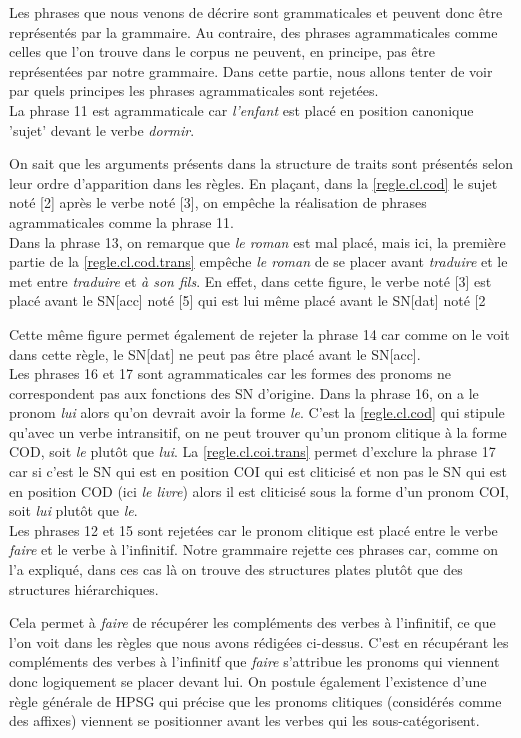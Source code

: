 Les phrases que nous venons de décrire sont grammaticales et peuvent donc être représentés par la grammaire.
Au contraire, des phrases agrammaticales comme celles que l'on trouve dans le corpus ne peuvent, en principe, pas être représentées par notre grammaire.
Dans cette partie, nous allons tenter de voir par quels principes les phrases agrammaticales sont rejetées.\\

La phrase 11 est agrammaticale car \emph{l'enfant} est placé en position canonique 'sujet' devant le verbe \emph{dormir}.

On sait que les arguments présents dans la structure de traits sont présentés selon leur ordre d'apparition dans les règles.
En plaçant, dans la \autoref{regle.cl.cod} le sujet noté [2] après le verbe noté [3], on empêche la réalisation de phrases
agrammaticales comme la phrase 11.\\

Dans la phrase 13, on remarque que \emph{le roman} est mal placé, mais ici, la première partie de la \autoref{regle.cl.cod.trans} empêche \emph{le roman} de se placer avant \emph{traduire} et le met entre \emph{traduire} et \emph{à son fils}.
En effet, dans cette figure, le verbe noté [3] est placé avant le SN[acc] noté [5] qui est lui même placé avant le SN[dat] noté [2

Cette même figure permet également de rejeter la phrase 14 car comme on le voit dans cette règle, le SN[dat] ne peut pas être placé avant le SN[acc].\\

Les phrases 16 et 17 sont agrammaticales car les formes des pronoms ne correspondent pas aux fonctions des SN d'origine.
Dans la phrase 16, on a le pronom \emph{lui} alors qu'on devrait avoir la forme \emph{le}. C'est la \autoref{regle.cl.cod} qui stipule qu'avec un verbe intransitif, on ne peut trouver qu'un pronom clitique à la forme COD, soit \emph{le} plutôt que \emph{lui}.
La \autoref{regle.cl.coi.trans} permet d'exclure la phrase 17 car si c'est le SN qui est en position COI qui est cliticisé et non pas le SN qui est en position COD (ici \emph{le livre}) alors il est cliticisé sous la forme d'un pronom COI, soit \emph{lui} plutôt que \emph{le}.\\

Les phrases 12 et 15 sont rejetées car le pronom clitique est placé entre le verbe \emph{faire} et le verbe à l'infinitif.
Notre grammaire rejette ces phrases car, comme on l'a expliqué, dans ces cas là on trouve des structures plates plutôt que des
structures hiérarchiques.

Cela permet à \emph{faire} de récupérer les compléments des verbes à l'infinitif, ce que l'on voit dans les règles que nous avons rédigées ci-dessus.
C'est en récupérant les compléments des verbes à l'infinitf que \emph{faire} s'attribue les pronoms qui viennent donc logiquement se placer devant lui.
On postule également l'existence d'une règle générale de HPSG qui précise que les pronoms clitiques (considérés comme des affixes) viennent se positionner avant les verbes qui les sous-catégorisent.
